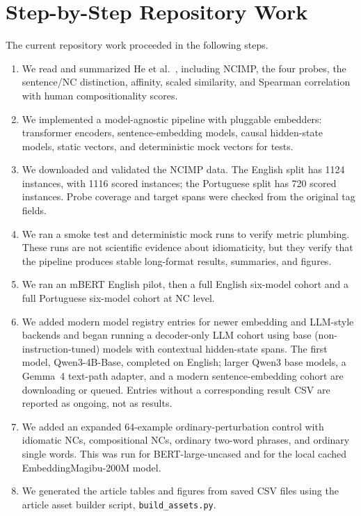\documentclass[11pt]{article}
\begin{document}
\section{Step-by-Step Repository Work}

The current repository work proceeded in the following steps.

\begin{enumerate}
  \item We read and summarized He et al.~\cite{he2025idiomaticity}, including NCIMP, the four
  probes, the sentence/NC distinction, affinity, scaled similarity, and Spearman correlation with
  human compositionality scores.
  \item We implemented a model-agnostic pipeline with pluggable embedders: transformer encoders,
  sentence-embedding models, causal hidden-state models, static vectors, and deterministic mock
  vectors for tests.
  \item We downloaded and validated the NCIMP data. The English split has 1124 instances, with
  1116 scored instances; the Portuguese split has 720 scored instances. Probe coverage and target
  spans were checked from the original tag fields.
  \item We ran a smoke test and deterministic mock runs to verify metric plumbing. These runs are
  not scientific evidence about idiomaticity, but they verify that the pipeline produces stable
  long-format results, summaries, and figures.
  \item We ran an mBERT English pilot, then a full English six-model cohort and a full Portuguese
  six-model cohort at NC level.
  \item We added modern model registry entries for newer embedding and LLM-style backends and began
  running a decoder-only LLM cohort using base (non-instruction-tuned) models with contextual
  hidden-state spans. The first model, Qwen3-4B-Base, completed on English; larger Qwen3 base
  models, a Gemma~4 text-path adapter, and a modern sentence-embedding cohort are downloading or
  queued. Entries without a corresponding result CSV are reported as ongoing, not as results.
  \item We added an expanded 64-example ordinary-perturbation control with idiomatic NCs,
  compositional NCs, ordinary two-word phrases, and ordinary single words. This was run for
  BERT-large-uncased and for the local cached EmbeddingMagibu-200M model.
  \item We generated the article tables and figures from saved CSV files using the article
  asset builder script, \texttt{build\_assets.py}.
\end{enumerate}
\end{document}
